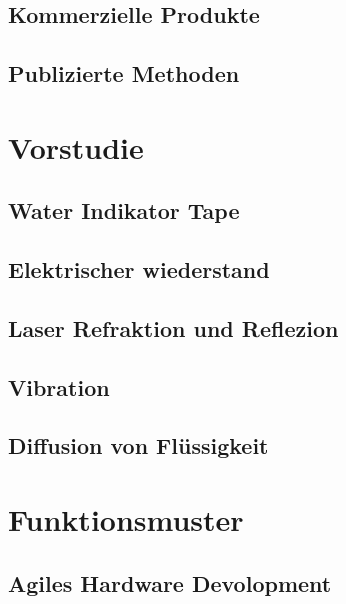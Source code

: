 \documentclass[a4paper,12pt]{article}
\begin{document}
\subsection{Kommerzielle Produkte}


\subsection{Publizierte Methoden}
\label{sec:PubMeth}


\section{Vorstudie}


\subsection{Water Indikator Tape}


\subsection{Elektrischer wiederstand}


\subsection{Laser Refraktion und Reflezion}


\subsection{Vibration}


\subsection{Diffusion von Flüssigkeit}
\label{sec:TinteVersuchsaufbau}


\section{Funktionsmuster}


\subsection{Agiles Hardware Devolopment}

\end{document}
